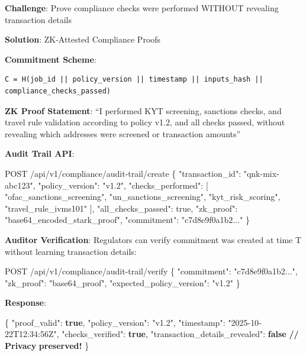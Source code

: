 \documentclass[
  11pt,
]{article}
\newenvironment{Shaded}{\begin{snugshade}}{\end{snugshade}}
\newcommand{\DataTypeTok}[1]{\textcolor[rgb]{0.13,0.29,0.53}{#1}}
\newcommand{\ErrorTok}[1]{\textcolor[rgb]{0.64,0.00,0.00}{\textbf{#1}}}
\newcommand{\FunctionTok}[1]{\textcolor[rgb]{0.00,0.00,0.00}{#1}}
\newcommand{\KeywordTok}[1]{\textcolor[rgb]{0.13,0.29,0.53}{\textbf{#1}}}
\newcommand{\NormalTok}[1]{#1}
\newcommand{\StringTok}[1]{\textcolor[rgb]{0.31,0.60,0.02}{#1}}
\begin{document}
\textbf{Challenge}: Prove compliance checks were performed WITHOUT
revealing transaction details

\textbf{Solution}: ZK-Attested Compliance Proofs

\textbf{Commitment Scheme}:

\begin{verbatim}
C = H(job_id || policy_version || timestamp || inputs_hash || compliance_checks_passed)
\end{verbatim}

\textbf{ZK Proof Statement}: ``I performed KYT screening, sanctions
checks, and travel rule validation according to policy v1.2, and all
checks passed, without revealing which addresses were screened or
transaction amounts''

\textbf{Audit Trail API}:

\begin{Shaded}
\begin{Highlighting}[]
\NormalTok{POST /api/v1/compliance/audit{-}trail/create}
\NormalTok{\{}
\NormalTok{  "transaction\_id": "qnk{-}mix{-}abc123",}
\NormalTok{  "policy\_version": "v1.2",}
\NormalTok{  "checks\_performed": [}
\NormalTok{    "ofac\_sanctions\_screening",}
\NormalTok{    "un\_sanctions\_screening",}
\NormalTok{    "kyt\_risk\_scoring",}
\NormalTok{    "travel\_rule\_ivms101"}
\NormalTok{  ],}
\NormalTok{  "all\_checks\_passed": true,}
\NormalTok{  "zk\_proof": "base64\_encoded\_stark\_proof",}
\NormalTok{  "commitment": "c7d8e9f0a1b2..."}
\NormalTok{\}}
\end{Highlighting}
\end{Shaded}

\textbf{Auditor Verification}: Regulators can verify commitment was
created at time T without learning transaction details:

\begin{Shaded}
\begin{Highlighting}[]
\NormalTok{POST /api/v1/compliance/audit{-}trail/verify}
\NormalTok{\{}
\NormalTok{  "commitment": "c7d8e9f0a1b2...",}
\NormalTok{  "zk\_proof": "base64\_proof",}
\NormalTok{  "expected\_policy\_version": "v1.2"}
\NormalTok{\}}
\end{Highlighting}
\end{Shaded}

\textbf{Response}:

\begin{Shaded}
\begin{Highlighting}[]
\FunctionTok{\{}
  \DataTypeTok{"proof\_valid"}\FunctionTok{:} \KeywordTok{true}\FunctionTok{,}
  \DataTypeTok{"policy\_version"}\FunctionTok{:} \StringTok{"v1.2"}\FunctionTok{,}
  \DataTypeTok{"timestamp"}\FunctionTok{:} \StringTok{"2025{-}10{-}22T12:34:56Z"}\FunctionTok{,}
  \DataTypeTok{"checks\_verified"}\FunctionTok{:} \KeywordTok{true}\FunctionTok{,}
  \DataTypeTok{"transaction\_details\_revealed"}\FunctionTok{:} \KeywordTok{false}  \ErrorTok{//} \ErrorTok{Privacy} \ErrorTok{preserved!}
\FunctionTok{\}}
\end{Highlighting}
\end{Shaded}
\end{document}
